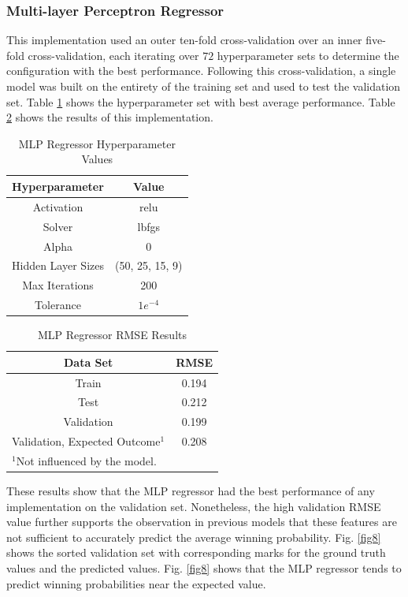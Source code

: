 \documentclass[conference]{IEEEtran}
\begin{document}
\subsubsection{Multi-layer Perceptron Regressor}
This implementation used an outer ten-fold cross-validation over an inner five-fold cross-validation, each iterating over $72$ hyperparameter sets to determine the configuration with the best performance. Following this cross-validation, a single model was built on the entirety of the training set and used to test the validation set. Table \ref{tab6} shows the hyperparameter set with best average performance. Table \ref{tab7} shows the results of this implementation.

\begin{table}[htbp]
\caption{MLP Regressor Hyperparameter Values}
\begin{center}
\begin{tabular}{|c||c|}
\hline
\textbf{Hyperparameter} & \textbf{Value} \\
\hline
\hline
Activation & relu \\
\hline
Solver & lbfgs \\
\hline
Alpha & 0 \\
\hline
Hidden Layer Sizes & (50, 25, 15, 9) \\
\hline
Max Iterations & 200 \\
\hline
Tolerance & $1e^{-4}$ \\
\hline
\end{tabular}
\label{tab6}
\end{center}
\end{table}

\begin{table}[htbp]
\caption{MLP Regressor RMSE Results}
\begin{center}
\begin{tabular}{|c||c|}
\hline
\textbf{Data Set} & \textbf{RMSE} \\
\hline
\hline
Train & 0.194 \\
\hline
Test & 0.212 \\
\hline
Validation & 0.199 \\
\hline
Validation, Expected Outcome$^{\mathrm{1}}$ & 0.208 \\
\hline
\multicolumn{2}{l}{$^{\mathrm{1}}$Not influenced by the model.}
\end{tabular}
\label{tab7}
\end{center}
\end{table}

These results show that the MLP regressor had the best performance of any implementation on the validation set. Nonetheless, the high validation RMSE value further supports the observation in previous models that these features are not sufficient to accurately predict the average winning probability. Fig. \ref{fig8} shows the sorted validation set with corresponding marks for the ground truth values and the predicted values.  Fig. \ref{fig8} shows that the MLP regressor tends to predict winning probabilities near the expected value. 
\end{document}

